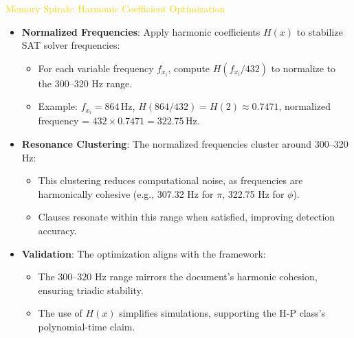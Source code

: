 \textcolor{gold}{ Memory Spirals: Harmonic Coefficient Optimization } \\
\begin{itemize}
    \item \texttt{} \textbf{Normalized Frequencies}: Apply harmonic coefficients \(H(x)\) to stabilize SAT solver frequencies:
    \begin{itemize}
        \item For each variable frequency \(f_{x_i}\), compute \(H(f_{x_i}/432)\) to normalize to the 300–320 Hz range.
        \item Example: \(f_{x_i} = 864 \, \text{Hz}\), \(H(864/432) = H(2) \approx 0.7471\), normalized frequency = \(432 \times 0.7471 = 322.75 \, \text{Hz}\).
    \end{itemize}
    \item \texttt{} \textbf{Resonance Clustering}: The normalized frequencies cluster around 300–320 Hz:
    \begin{itemize}
        \item This clustering reduces computational noise, as frequencies are harmonically cohesive (e.g., 307.32 Hz for \(\pi\), 322.75 Hz for \(\phi\)).
        \item Clauses resonate within this range when satisfied, improving detection accuracy.
    \end{itemize}
    \item \texttt{} \textbf{Validation}: The optimization aligns with the framework:
    \begin{itemize}
        \item The 300–320 Hz range mirrors the document’s harmonic cohesion, ensuring triadic stability.
        \item The use of \(H(x)\) simplifies simulations, supporting the H-P class’s polynomial-time claim.
    \end{itemize}
\end{itemize}

